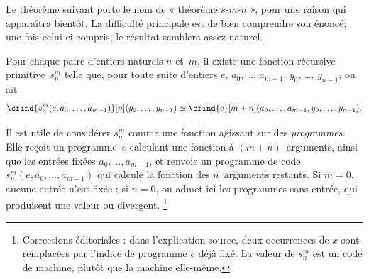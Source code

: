 \documentclass[../../../include/open-logic-section]{subfiles}
\begin{document}

\begin{explain}
Le théorème suivant porte le nom de « théorème
$s$-$m$-$n$ », pour une raison qui apparaîtra
bientôt. La difficulté principale est de bien
comprendre son énoncé; une fois celui-ci compris,
le résultat semblera assez naturel.
\end{explain}

\begin{thm}
  Pour chaque paire d'entiers naturels $n$ et~$m$,
  il existe une fonction récursive primitive~$s^m_n$
  telle que, pour toute suite d'entiers
  $e$, $a_0$, \dots, $a_{m-1}$,
  $y_0$, \dots, $y_{n-1}$, on ait
  \[
  \cfind{s^m_n(e, a_0, \dots, a_{m-1})}[n](y_0, \dots, y_{n-1}) \simeq
  \cfind{e}[m+n](a_0, \dots, a_{m-1}, y_0, \dots, y_{n-1}).
\]
\end{thm}

\begin{explain}
Il est utile de considérer $s^m_n$ comme une
fonction agissant sur des \emph{programmes}.
Elle reçoit un programme~$e$ calculant une
fonction à $(m+n)$~arguments, ainsi que
les entrées fixées $a_0,\dots,a_{m-1}$,
et renvoie un programme de code
$s^m_n(e,a_0,\dots,a_{m-1})$ qui calcule
la fonction des $n$~arguments restants. Si $m=0$, aucune entrée n'est fixée ; si $n=0$, on admet ici les programmes sans entrée, qui produisent une valeur ou divergent.
\footnote{Corrections éditoriales : dans l'explication source, deux occurrences de $x$ sont remplacées par l'indice de programme $e$ déjà fixé. La valeur de $s^m_n$ est un code de machine, plutôt que la machine elle-même.}
\end{explain}
\end{document}
